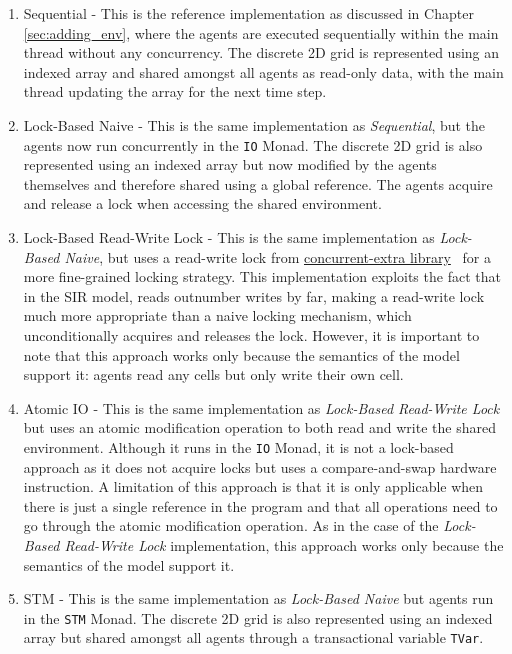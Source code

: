 \begin{enumerate}
	\item Sequential - This is the reference implementation as discussed in Chapter \ref{sec:adding_env}, where the agents are executed sequentially within the main thread without any concurrency. The discrete 2D grid is represented using an indexed array \cite{array_hackage} and shared amongst all agents as read-only data, with the main thread updating the array for the next time step.
		
	\item Lock-Based Naive - This is the same implementation as \textit{Sequential}, but the agents now run concurrently in the \texttt{IO} Monad. The discrete 2D grid is also represented using an indexed array but now modified by the agents themselves and therefore shared using a global reference. The agents acquire and release a lock when accessing the shared environment.

	\item Lock-Based Read-Write Lock - This is the same implementation as \textit{Lock-Based Naive}, but uses a read-write lock from \href{http://hackage.haskell.org/package/concurrent-extra}{concurrent-extra library}~\cite{concurrent_extra_library} for a more fine-grained locking strategy. This implementation exploits the fact that in the SIR model, reads outnumber writes by far, making a read-write lock much more appropriate than a naive locking mechanism, which unconditionally acquires and releases the lock. However, it is important to note that this approach works only because the semantics of the model support it: agents read any cells but only write their own cell. 
	
	\item Atomic IO - This is the same implementation as \textit{Lock-Based Read-Write Lock} but uses an atomic modification operation to both read and write the shared environment. Although it runs in the \texttt{IO} Monad, it is not a lock-based approach as it does not acquire locks but uses a compare-and-swap hardware instruction. A limitation of this approach is that it is only applicable when there is just a single reference in the program and that all operations need to go through the atomic modification operation. As in the case of the \textit{Lock-Based Read-Write Lock} implementation, this approach works only because the semantics of the model support it. 
	
	\item STM - This is the same implementation as \textit{Lock-Based Naive} but agents run in the \texttt{STM} Monad. The discrete 2D grid is also represented using an indexed array but shared amongst all agents through a transactional variable \texttt{TVar}.
	
\end{enumerate}

